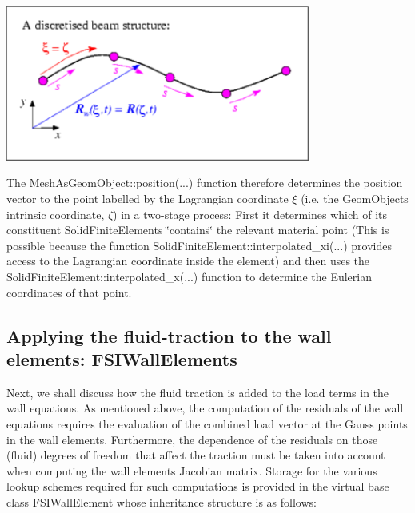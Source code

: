  
\begin{DoxyImage}
\includegraphics[width=0.75\textwidth]{wall_mesh_geometry_sketch3}
\end{DoxyImage}


The {\ttfamily Mesh\+As\+Geom\+Object\+::position}(...) function therefore determines the position vector to the point labelled by the Lagrangian coordinate $ \xi $ (i.\+e. the {\ttfamily Geom\+Object\textquotesingle{}s} intrinsic coordinate, $ \zeta $) in a two-\/stage process\+: First it determines which of its constituent {\ttfamily Solid\+Finite\+Elements} \char`\"{}contains\char`\"{} the relevant material point (This is possible because the function {\ttfamily Solid\+Finite\+Element\+::interpolated\+\_\+xi}(...) provides access to the Lagrangian coordinate inside the element) and then uses the {\ttfamily Solid\+Finite\+Element\+::interpolated\+\_\+x}(...) function to determine the Eulerian coordinates of that point.



\hypertarget{index_fsi_wall_elements}{}\subsection{Applying the fluid-\/traction to the wall elements\+: F\+S\+I\+Wall\+Elements}\label{index_fsi_wall_elements}
Next, we shall discuss how the fluid traction is added to the load terms in the wall equations. As mentioned above, the computation of the residuals of the wall equations requires the evaluation of the combined load vector at the Gauss points in the wall elements. Furthermore, the dependence of the residuals on those (fluid) degrees of freedom that affect the traction must be taken into account when computing the wall element\textquotesingle{}s Jacobian matrix. Storage for the various lookup schemes required for such computations is provided in the virtual base class {\ttfamily F\+S\+I\+Wall\+Element} whose inheritance structure is as follows\+:


